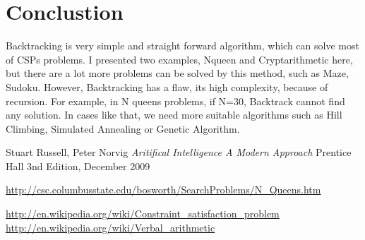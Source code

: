 \documentclass[a4paper, 11pt]{article}
\begin{document}
\newpage
\section{Conclustion}
Backtracking is very simple and straight forward algorithm, which can solve most of CSPs problems. I presented two examples, Nqueen and Cryptarithmetic here, but there are a lot more problems can be solved by this method, such as Maze, Sudoku. However, Backtracking has a flaw, its high complexity, because of recursion. For example, in N queens problems, if N=30, Backtrack cannot find any solution. In cases like that, we need more suitable algorithms such as Hill Climbing, Simulated Annealing or Genetic Algorithm.

\begin{thebibliography}{9}
  \label{itm:AIMA}
  Stuart Russell, Peter Norvig
  \emph{  Aritifical Intelligence A Modern Approach}
  Prentice Hall
  3nd Edition,
  December 2009

  \label{itm:symmetry}
  \url{http://csc.columbusstate.edu/bosworth/SearchProblems/N_Queens.htm}

  \label{itm:wiki}
  \url{http://en.wikipedia.org/wiki/Constraint_satisfaction_problem} \\
  \url{http://en.wikipedia.org/wiki/Verbal_arithmetic}

\end{thebibliography}
\end{document}
